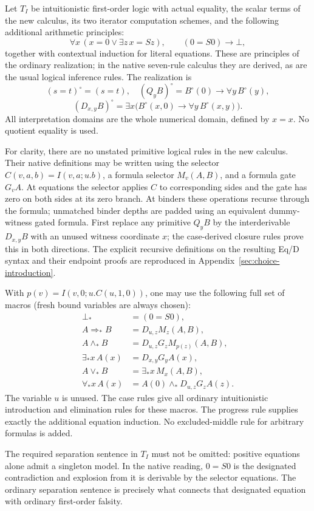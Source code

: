 \documentclass[11pt]{article}
\theoremstyle{definition}
\theoremstyle{remark}
\begin{document}
Let \(T_I\) be intuitionistic first-order logic with actual equality, the
scalar terms of the new calculus, its two iterator computation schemes,
and the following additional arithmetic principles:
\[
 \forall x\,(x=0\lor\exists z\,x=Sz),\qquad
 (0=S0)\to\bot,
\]
together with contextual induction for literal equations. These are
principles of the ordinary realization; in the native seven-rule calculus
they are derived, as are the usual logical inference rules.
The realization is
\[
 (s=t)^\circ=(s=t),\quad
 (Q_y B)^\circ=B^\circ(0)\to\forall y\,B^\circ(y),
\]
\[
 (D_{x,y}B)^\circ=
 \exists x\bigl(B^\circ(x,0)\to\forall y\,B^\circ(x,y)\bigr).
\]
All interpretation domains are the whole numerical domain, defined by
\(x=x\). No quotient equality is used.

For clarity, there are no unstated primitive logical rules in the new
calculus. Their native definitions may be written using the selector
\(C(v,a,b)=I(v,a;u.b)\), a formula selector \(M_v(A,B)\), and a formula
gate \(G_vA\). At equations the selector applies \(C\) to corresponding
sides and the gate has zero on both sides at its zero branch. At binders
these operations recurse through the formula; unmatched binder depths are
padded using an equivalent dummy-witness gated formula. First replace any
primitive \(Q_yB\) by the interderivable \(D_{x,y}B\) with an unused
witness coordinate \(x\); the case-derived closure rules prove this in
both directions. The explicit recursive definitions on the resulting
Eq/D syntax and their endpoint proofs are reproduced in
Appendix~\ref{sec:choice-introduction}.

With \(p(v)=I(v,0;u.C(u,1,0))\), one may use the following full set of
macros (fresh bound variables are always chosen):
\begin{align*}
 \bot_*&=(0=S0),\\
 A\Rightarrow_* B&=D_{u,z}M_z(A,B),\\
 A\wedge_* B&=D_{u,z}G_zM_{p(z)}(A,B),\\
 \exists_*x\,A(x)&=D_{x,y}G_yA(x),\\
 A\vee_*B&=\exists_*x\,M_x(A,B),\\
 \forall_*x\,A(x)&=A(0)\wedge_*D_{u,z}G_zA(z).
\end{align*}
The variable \(u\) is unused. The case rules give all ordinary
intuitionistic introduction and elimination rules for these macros.
The progress rule supplies exactly the additional equation induction.
No excluded-middle rule for arbitrary formulas is added.

The required separation sentence in \(T_I\) must not be omitted:
positive equations alone admit a singleton model. In the native reading,
\(0=S0\) is the designated contradiction and explosion from it is
derivable by the selector equations. The ordinary separation sentence
is precisely what connects that designated equation with ordinary
first-order falsity.
\end{document}
